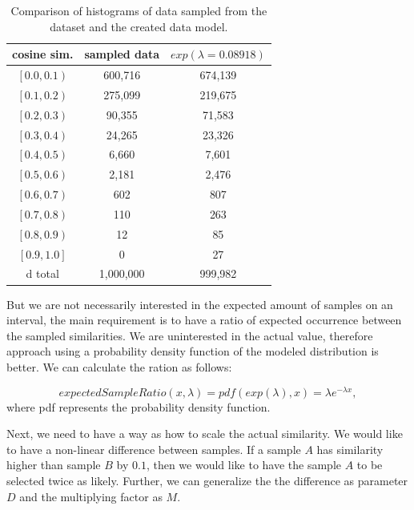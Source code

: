 \begin{table}[!ht]
    \centering
    \begin{tabular}{ c | c | c}
       cosine sim. & sampled data & $exp(\lambda=0.08918)$ \\
        \hline
        $\left[ 0.0, 0.1\right)$ & 600,716 & 674,139 \\
        $\left[ 0.1, 0.2\right)$ & 275,099 & 219,675 \\
        $\left[ 0.2, 0.3\right)$ & 90,355 & 71,583 \\
        $\left[ 0.3, 0.4\right)$ & 24,265 & 23,326 \\
        $\left[ 0.4, 0.5\right)$ & 6,660 & 7,601 \\
        $\left[ 0.5, 0.6\right)$ & 2,181 & 2,476 \\
        $\left[ 0.6, 0.7\right)$ & 602 & 807 \\
        $\left[ 0.7, 0.8\right)$ & 110 & 263 \\
        $\left[ 0.8, 0.9\right)$ & 12 & 85 \\
        $\left[ 0.9, 1.0\right]$ & 0 & 27 \\d
        total & 1,000,000 & 999,982
            
    \end{tabular}
    \caption{Comparison of histograms of data sampled from the dataset and the created data model.}
    \label{table:5.3_modeled_comparison}
\end{table}

But we are not necessarily interested in the expected amount of samples on an interval, the main requirement is to have a ratio of expected occurrence between the sampled similarities. We are uninterested in the actual value, therefore approach using a probability density function of the modeled distribution is better. We can calculate the ration as follows:

\begin{equation}
    expectedSampleRatio(x, \lambda) = pdf(exp(\lambda), x) = \lambda e ^{-\lambda x},
\end{equation}
where pdf represents the probability density function.

Next, we need to have a way as how to scale the actual similarity. We would like to have a non-linear difference between samples. If a sample $A$ has similarity higher than sample $B$ by $0.1$, then we would like to have the sample $A$ to be selected twice as likely. Further, we can generalize the the difference as parameter $D$ and the multiplying factor as $M$.

